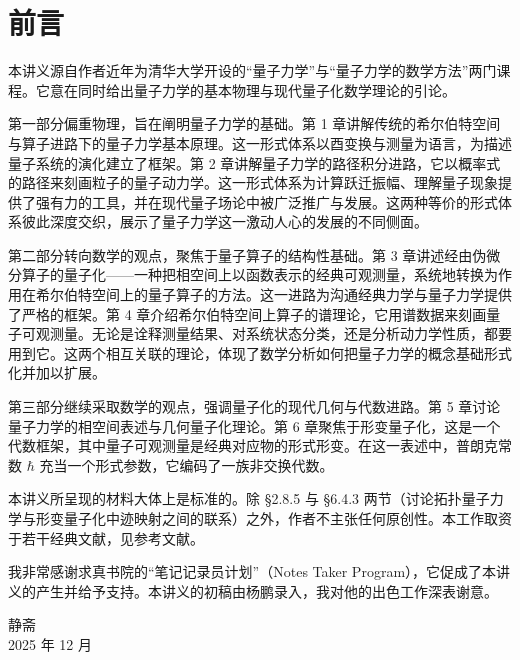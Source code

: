 \chapter*{前言}

本讲义源自作者近年为清华大学开设的“量子力学”与“量子力学的数学方法”两门课程。它意在同时给出量子力学的基本物理与现代量子化数学理论的引论。

第一部分偏重物理，旨在阐明量子力学的基础。第 1 章讲解传统的希尔伯特空间与算子进路下的量子力学基本原理。这一形式体系以酉变换与测量为语言，为描述量子系统的演化建立了框架。第 2 章讲解量子力学的路径积分进路，它以概率式的路径来刻画粒子的量子动力学。这一形式体系为计算跃迁振幅、理解量子现象提供了强有力的工具，并在现代量子场论中被广泛推广与发展。这两种等价的形式体系彼此深度交织，展示了量子力学这一激动人心的发展的不同侧面。

第二部分转向数学的观点，聚焦于量子算子的结构性基础。第 3 章讲述经由伪微分算子的量子化——一种把相空间上以函数表示的经典可观测量，系统地转换为作用在希尔伯特空间上的量子算子的方法。这一进路为沟通经典力学与量子力学提供了严格的框架。第 4 章介绍希尔伯特空间上算子的谱理论，它用谱数据来刻画量子可观测量。无论是诠释测量结果、对系统状态分类，还是分析动力学性质，都要用到它。这两个相互关联的理论，体现了数学分析如何把量子力学的概念基础形式化并加以扩展。

第三部分继续采取数学的观点，强调量子化的现代几何与代数进路。第 5 章讨论量子力学的相空间表述与几何量子化理论。第 6 章聚焦于形变量子化，这是一个代数框架，其中量子可观测量是经典对应物的形式形变。在这一表述中，普朗克常数 $\hbar$ 充当一个形式参数，它编码了一族非交换代数。

本讲义所呈现的材料大体上是标准的。除 §2.8.5 与 §6.4.3 两节（讨论拓扑量子力学与形变量子化中迹映射之间的联系）之外，作者不主张任何原创性。本工作取资于若干经典文献，见参考文献。

我非常感谢求真书院的“笔记记录员计划”（Notes Taker Program），它促成了本讲义的产生并给予支持。本讲义的初稿由杨鹏录入，我对他的出色工作深表谢意。

\vspace{1.2em}
\begin{flushright}
静斋\\
2025 年 12 月
\end{flushright}

\vspace{1.6em}
